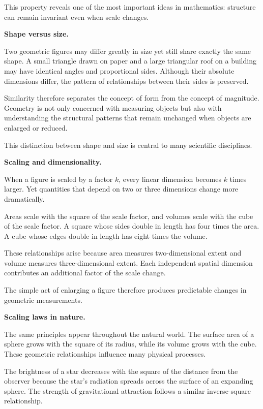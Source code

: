 \documentclass[11pt, openany]{book}
\theoremstyle{plain}
\theoremstyle{definition}
\theoremstyle{remark}
\begin{document}
This property reveals one of the most important ideas in mathematics:
structure can remain invariant even when scale changes.

\medskip

\textbf{Shape versus size.}

Two geometric figures may differ greatly in size yet still share exactly
the same shape. A small triangle drawn on paper and a large triangular
roof on a building may have identical angles and proportional sides.
Although their absolute dimensions differ, the pattern of relationships
between their sides is preserved.

Similarity therefore separates the concept of form from the concept of
magnitude. Geometry is not only concerned with measuring objects but
also with understanding the structural patterns that remain unchanged
when objects are enlarged or reduced.

This distinction between shape and size is central to many scientific
disciplines.

\medskip

\textbf{Scaling and dimensionality.}

When a figure is scaled by a factor $k$, every linear dimension becomes
$k$ times larger. Yet quantities that depend on two or three dimensions
change more dramatically.

Areas scale with the square of the scale factor, and volumes scale with
the cube of the scale factor. A square whose sides double in length has
four times the area. A cube whose edges double in length has eight times
the volume.

These relationships arise because area measures two-dimensional extent
and volume measures three-dimensional extent. Each independent spatial
dimension contributes an additional factor of the scale change.

The simple act of enlarging a figure therefore produces predictable
changes in geometric measurements.

\medskip

\textbf{Scaling laws in nature.}

The same principles appear throughout the natural world. The surface
area of a sphere grows with the square of its radius, while its volume
grows with the cube. These geometric relationships influence many
physical processes.

The brightness of a star decreases with the square of the distance from
the observer because the star's radiation spreads across the surface of
an expanding sphere. The strength of gravitational attraction follows a
similar inverse-square relationship.
\end{document}
